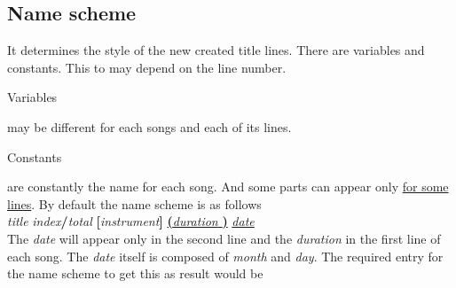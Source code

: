 \documentclass[10pt,a4paper,oneside]{article}
\begin{document}
\subsection{Name scheme}
\label{name-scheme}
It determines the style of the new created title lines. There are variables and constants. This to may depend on the line number. \begin{it} Variables \end{it} may be different for each songs and each of its lines. \begin{bf} Constants \end{bf} are constantly the name for each song. And some parts can appear only \underline{for some lines}. By default the name scheme is as follows\\ 
\textit{title} \textit{index}\textbf{/}\textit{total} \textbf{[}\textit{instrument}\textbf{]} \underline{ \textbf{(}\textit{duration} \textbf{)}} \underline{\textit{date}} \\ The \textit{date} will appear only in the second line and the \textit{duration} in the first line of each song. The \textit{date} itself is composed of \textit{month} and \textit{day}. The required entry for the name scheme to get this as result would be
\end{document}
